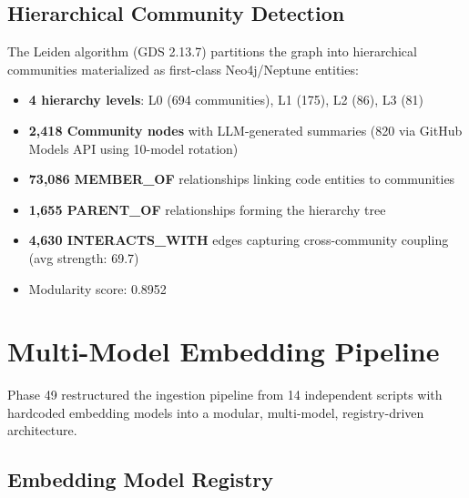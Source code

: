 \documentclass[11pt,letterpaper]{article}
\begin{document}
\subsection{Hierarchical Community Detection}

The Leiden algorithm (GDS 2.13.7) partitions the graph into hierarchical
communities materialized as first-class Neo4j/Neptune entities:

\begin{itemize}[noitemsep]
    \item \textbf{4 hierarchy levels}: L0 (694 communities), L1 (175),
          L2 (86), L3 (81)
    \item \textbf{2,418 Community nodes} with LLM-generated summaries
          (820 via GitHub Models API using 10-model rotation)
    \item \textbf{73,086 MEMBER\_OF} relationships linking code entities
          to communities
    \item \textbf{1,655 PARENT\_OF} relationships forming the hierarchy tree
    \item \textbf{4,630 INTERACTS\_WITH} edges capturing cross-community
          coupling (avg strength: 69.7)
    \item Modularity score: 0.8952
\end{itemize}

\section{Multi-Model Embedding Pipeline}
\label{sec:embeddings}

Phase 49 restructured the ingestion pipeline from 14 independent scripts
with hardcoded embedding models into a modular, multi-model, registry-driven
architecture.

\subsection{Embedding Model Registry}
\end{document}

